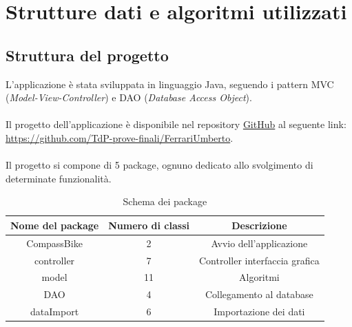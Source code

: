 \documentclass[a4paper, 12pt]{article}
\begin{document}
\newpage


\section{Strutture dati e algoritmi utilizzati}

	\subsection{Struttura del progetto}
	
	L'applicazione è stata sviluppata in linguaggio Java, seguendo i pattern MVC (\textit{Model-View-Controller}) e DAO (\textit{Database Access Object}).\\\\
	Il progetto dell'applicazione è disponibile nel repository \href{https://github.com/}{GitHub} al seguente link: \url{https://github.com/TdP-prove-finali/FerrariUmberto}.\\\\
	Il progetto si compone di 5 package, ognuno dedicato allo svolgimento di determinate funzionalità.\\

	\begin{table}
	\begin{center}
	\caption{Schema dei package}
	 \begin{tabular}{| c | c |  c |} 
	 \hline
	 \textbf{Nome del package} & \textbf{Numero di classi} & \textbf{Descrizione} \\ [0.5ex] 
	\hline
	 \hline
	 CompassBike & 2 & Avvio dell'applicazione \\
	 \hline
	 controller & 7 & Controller interfaccia grafica \\  
	 \hline
	 model & 11 & Algoritmi \\
	 \hline
	 DAO & 4 & Collegamento al database \\
	 \hline
	 dataImport & 6 & Importazione dei dati \\
	 \hline
	\end{tabular}
	\end{center}
	\end{table}
\end{document}
